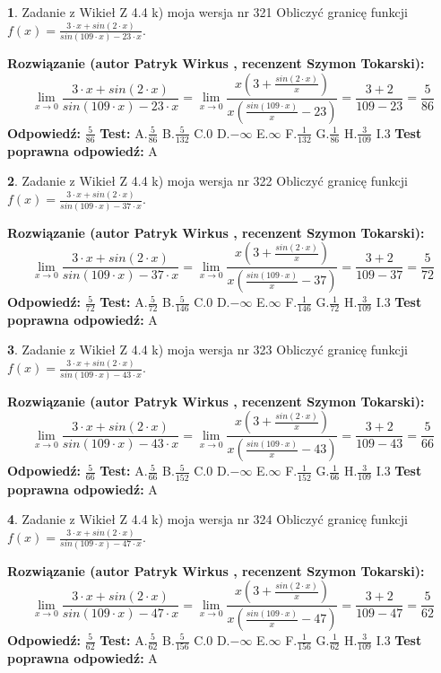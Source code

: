 \documentclass[12pt, a4paper]{article}
\theoremstyle{definition} %
\newtheorem{zad}{}
\newcommand{\zadStart}[1]{\begin{zad}#1\newline}
\newcommand{\zadStop}{\end{zad}}
\newcommand{\rozwStart}[2]{\noindent \textbf{Rozwiązanie (autor #1 , recenzent #2): }\newline}
\newcommand{\rozwStop}{\newline}
\newcommand{\odpStart}{\noindent \textbf{Odpowiedź:}\newline}
\newcommand{\odpStop}{\newline}
\newcommand{\testStart}{\noindent \textbf{Test:}\newline}
\newcommand{\testStop}{\newline}
\newcommand{\kluczStart}{\noindent \textbf{Test poprawna odpowiedź:}\newline}
\newcommand{\kluczStop}{\newline}
\begin{document}
\zadStart{Zadanie z Wikieł Z 4.4 k) moja wersja nr 321}
Obliczyć granicę funkcji $f(x)=\frac{3\cdot x +sin(2\cdot x)}{sin(109\cdot x) -23\cdot x}$.
\zadStop
\rozwStart{Patryk Wirkus}{Szymon Tokarski}
$$\lim\limits_{x\to 0}\frac{3\cdot x +sin(2\cdot x)}{sin(109\cdot x) -23\cdot x}
=\lim\limits_{x\to 0}\frac{x(3+\frac{sin(2\cdot x)}{x})}{x(\frac{sin(109\cdot x)}{x}-23)}
=\frac{3+2}{109-23} = \frac{5}{86}$$
\rozwStop
\odpStart
$\frac{5}{86}$
\odpStop
\testStart
A.$\frac{5}{86}$
B.$\frac{5}{132}$
C.$0$
D.$-\infty$
E.$\infty$
F.$\frac{1}{132}$
G.$\frac{1}{86}$
H.$\frac{3}{109}$
I.$3$
\testStop
\kluczStart
A
\kluczStop



\zadStart{Zadanie z Wikieł Z 4.4 k) moja wersja nr 322}
Obliczyć granicę funkcji $f(x)=\frac{3\cdot x +sin(2\cdot x)}{sin(109\cdot x) -37\cdot x}$.
\zadStop
\rozwStart{Patryk Wirkus}{Szymon Tokarski}
$$\lim\limits_{x\to 0}\frac{3\cdot x +sin(2\cdot x)}{sin(109\cdot x) -37\cdot x}
=\lim\limits_{x\to 0}\frac{x(3+\frac{sin(2\cdot x)}{x})}{x(\frac{sin(109\cdot x)}{x}-37)}
=\frac{3+2}{109-37} = \frac{5}{72}$$
\rozwStop
\odpStart
$\frac{5}{72}$
\odpStop
\testStart
A.$\frac{5}{72}$
B.$\frac{5}{146}$
C.$0$
D.$-\infty$
E.$\infty$
F.$\frac{1}{146}$
G.$\frac{1}{72}$
H.$\frac{3}{109}$
I.$3$
\testStop
\kluczStart
A
\kluczStop



\zadStart{Zadanie z Wikieł Z 4.4 k) moja wersja nr 323}
Obliczyć granicę funkcji $f(x)=\frac{3\cdot x +sin(2\cdot x)}{sin(109\cdot x) -43\cdot x}$.
\zadStop
\rozwStart{Patryk Wirkus}{Szymon Tokarski}
$$\lim\limits_{x\to 0}\frac{3\cdot x +sin(2\cdot x)}{sin(109\cdot x) -43\cdot x}
=\lim\limits_{x\to 0}\frac{x(3+\frac{sin(2\cdot x)}{x})}{x(\frac{sin(109\cdot x)}{x}-43)}
=\frac{3+2}{109-43} = \frac{5}{66}$$
\rozwStop
\odpStart
$\frac{5}{66}$
\odpStop
\testStart
A.$\frac{5}{66}$
B.$\frac{5}{152}$
C.$0$
D.$-\infty$
E.$\infty$
F.$\frac{1}{152}$
G.$\frac{1}{66}$
H.$\frac{3}{109}$
I.$3$
\testStop
\kluczStart
A
\kluczStop



\zadStart{Zadanie z Wikieł Z 4.4 k) moja wersja nr 324}
Obliczyć granicę funkcji $f(x)=\frac{3\cdot x +sin(2\cdot x)}{sin(109\cdot x) -47\cdot x}$.
\zadStop
\rozwStart{Patryk Wirkus}{Szymon Tokarski}
$$\lim\limits_{x\to 0}\frac{3\cdot x +sin(2\cdot x)}{sin(109\cdot x) -47\cdot x}
=\lim\limits_{x\to 0}\frac{x(3+\frac{sin(2\cdot x)}{x})}{x(\frac{sin(109\cdot x)}{x}-47)}
=\frac{3+2}{109-47} = \frac{5}{62}$$
\rozwStop
\odpStart
$\frac{5}{62}$
\odpStop
\testStart
A.$\frac{5}{62}$
B.$\frac{5}{156}$
C.$0$
D.$-\infty$
E.$\infty$
F.$\frac{1}{156}$
G.$\frac{1}{62}$
H.$\frac{3}{109}$
I.$3$
\testStop
\kluczStart
A
\kluczStop
\end{document}
